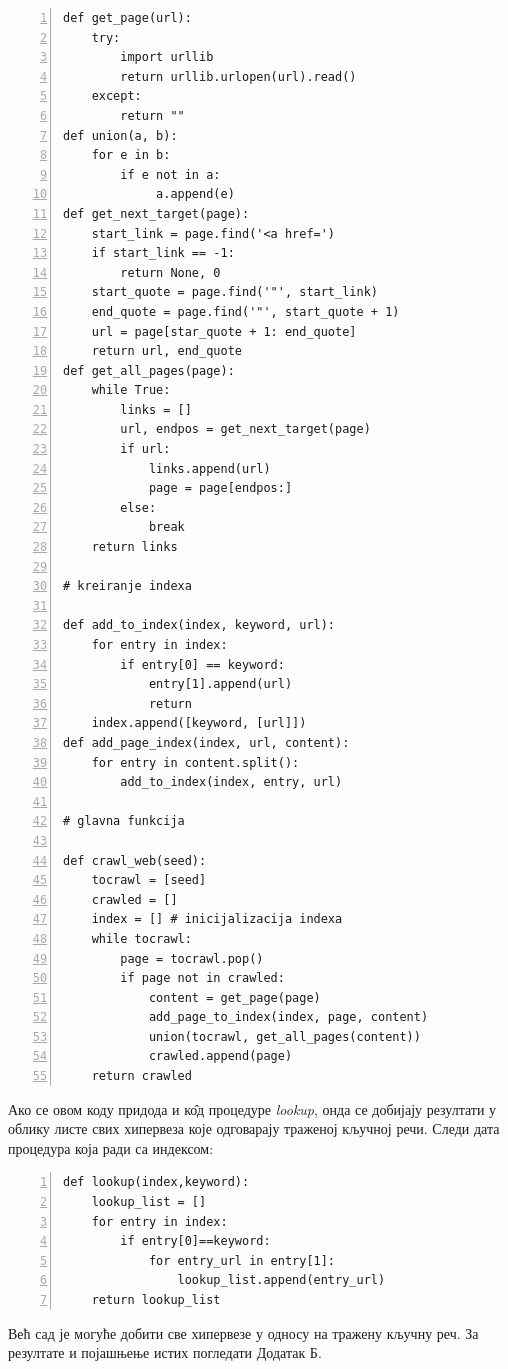 \begin{lstlisting}[caption=Веб-паук који ради са индексом, label={lst:crawler}, numbers=left]
def get_page(url):
    try:
        import urllib
        return urllib.urlopen(url).read()
    except:
        return ""
def union(a, b):
    for e in b:
        if e not in a:
             a.append(e)
def get_next_target(page):
    start_link = page.find('<a href=')
    if start_link == -1:
        return None, 0
    start_quote = page.find('"', start_link)
    end_quote = page.find('"', start_quote + 1)
    url = page[star_quote + 1: end_quote]
    return url, end_quote
def get_all_pages(page):
    while True:
        links = []
        url, endpos = get_next_target(page)
        if url:
            links.append(url)
            page = page[endpos:]
        else:
            break
    return links

# kreiranje indexa

def add_to_index(index, keyword, url):
    for entry in index:
        if entry[0] == keyword:
            entry[1].append(url)
            return
    index.append([keyword, [url]])
def add_page_index(index, url, content):
    for entry in content.split():
        add_to_index(index, entry, url)

# glavna funkcija

def crawl_web(seed):
    tocrawl = [seed]
    crawled = []
    index = [] # inicijalizacija indexa
    while tocrawl:
        page = tocrawl.pop()
        if page not in crawled:
            content = get_page(page)
            add_page_to_index(index, page, content)
            union(tocrawl, get_all_pages(content))
            crawled.append(page)
    return crawled
\end{lstlisting}

Ако се овом  коду придода и к\^{о}д процедуре \emph{lookup}, онда се добијају резултати у облику листе свих хипервеза које одговарају траженој кључној речи. Следи дата процедура која ради са индексом:

\begin{lstlisting}[caption=Процедура lookup која ради са индексом, label={lst:lookup_index}, numbers=left]
def lookup(index,keyword):
    lookup_list = []
    for entry in index:
        if entry[0]==keyword:
            for entry_url in entry[1]:
                lookup_list.append(entry_url)
    return lookup_list
\end{lstlisting}

Већ сад је могуће добити све хипервезе у односу на тражену кључну реч. За резултате и појашњење истих погледати Додатак Б.

